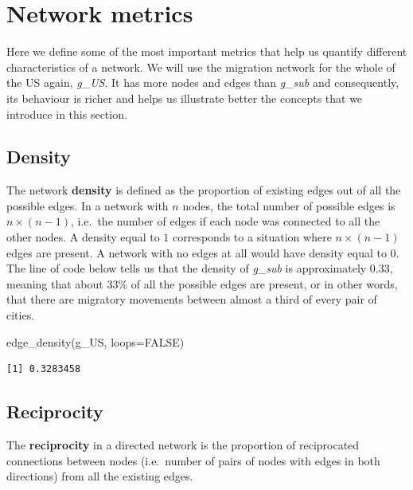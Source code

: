 \documentclass[
  letterpaper,
  DIV=11,
  numbers=noendperiod]{scrreprt}
\newenvironment{Shaded}{\begin{snugshade}}{\end{snugshade}}
\newcommand{\AttributeTok}[1]{\textcolor[rgb]{0.40,0.45,0.13}{#1}}
\newcommand{\ConstantTok}[1]{\textcolor[rgb]{0.56,0.35,0.01}{#1}}
\newcommand{\FunctionTok}[1]{\textcolor[rgb]{0.28,0.35,0.67}{#1}}
\newcommand{\NormalTok}[1]{\textcolor[rgb]{0.00,0.23,0.31}{#1}}
\begin{document}
\hypertarget{sec-sec_metrics}{%
\section{Network metrics}\label{sec-sec_metrics}}

Here we define some of the most important metrics that help us quantify
different characteristics of a network. We will use the migration
network for the whole of the US again, \emph{g\_US}. It has more nodes
and edges than \emph{g\_sub} and consequently, its behaviour is richer
and helps us illustrate better the concepts that we introduce in this
section.

\hypertarget{density}{%
\subsection{Density}\label{density}}

The network \textbf{density} is defined as the proportion of existing
edges out of all the possible edges. In a network with \(n\) nodes, the
total number of possible edges is \(n\times(n-1)\), i.e.~the number of
edges if each node was connected to all the other nodes. A density equal
to \(1\) corresponds to a situation where \(n\times(n-1)\) edges are
present. A network with no edges at all would have density equal to
\(0\). The line of code below tells us that the density of \emph{g\_sub}
is approximately 0.33, meaning that about 33\% of all the possible edges
are present, or in other words, that there are migratory movements
between almost a third of every pair of cities.

\begin{Shaded}
\begin{Highlighting}[]
\FunctionTok{edge\_density}\NormalTok{(g\_US, }\AttributeTok{loops=}\ConstantTok{FALSE}\NormalTok{)}
\end{Highlighting}
\end{Shaded}

\begin{verbatim}
[1] 0.3283458
\end{verbatim}

\hypertarget{reciprocity}{%
\subsection{Reciprocity}\label{reciprocity}}

The \textbf{reciprocity} in a directed network is the proportion of
reciprocated connections between nodes (i.e.~number of pairs of nodes
with edges in both directions) from all the existing edges.
\end{document}
